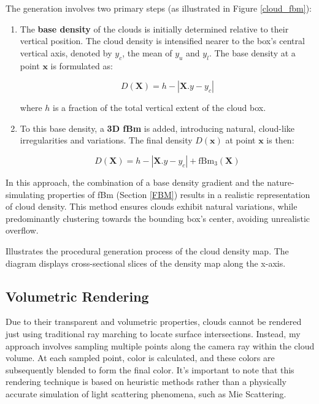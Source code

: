 The generation involves two primary steps (as illustrated in Figure \ref{cloud_fbm}):
\begin{enumerate}
    \item The \textbf{base density} of the clouds is initially determined relative to their vertical position. The cloud density is intensified nearer to the box's central vertical axis, denoted by $y_c$, the mean of $y_u$ and $y_l$. The base density at a point $\mathbf{x}$ is formulated as:

\begin{equation}
    D(\mathbf{X}) = h - |\mathbf{X}.y - y_{c}|
\end{equation}

    where $h$ is a fraction of the total vertical extent of the cloud box.

    \item To this base density, a \textbf{3D fBm} is added, introducing natural, cloud-like irregularities and variations. The final density $D(\mathbf{x})$ at point $\mathbf{x}$ is then:

\begin{equation}
    D(\mathbf{X}) = h - |\mathbf{X}.y - y_{c}| + \text{fBm}_3(\mathbf{X})
\end{equation}
\end{enumerate}

In this approach, the combination of a base density gradient and the nature-simulating properties of fBm (Section \ref{FBM}) results in a realistic representation of cloud density. This method ensures clouds exhibit natural variations, while predominantly clustering towards the bounding box's center, avoiding unrealistic overflow.

{Illustrates the procedural generation process of the cloud density map. The diagram displays cross-sectional slices of the density map along the x-axis.}

\subsection{Volumetric Rendering}

Due to their transparent and volumetric properties, clouds cannot be rendered just using traditional ray marching to locate surface intersections. Instead, my approach involves sampling multiple points along the camera ray within the cloud volume. At each sampled point, color is calculated, and these colors are subsequently blended to form the final color. It’s important to note that this rendering technique is based on heuristic methods rather than a physically accurate simulation of light scattering phenomena, such as Mie Scattering.

